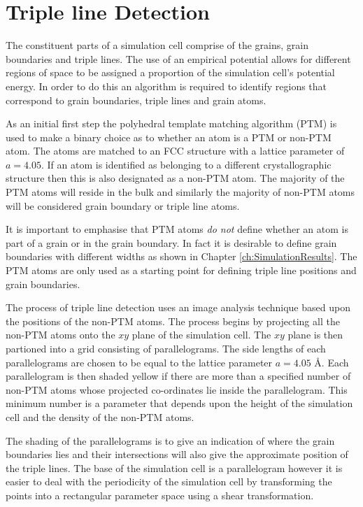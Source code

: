 \documentclass[12pt,a4paper,openany]{report}
\begin{document}
\section{Triple line Detection}

The constituent parts of a simulation cell comprise of the grains, grain boundaries and triple lines. The use of an empirical potential allows for different regions of space to be assigned a proportion of the simulation cell's potential energy. In order to do this an algorithm is required to identify regions that correspond to grain boundaries, triple lines and grain atoms.

As an initial first step the polyhedral template matching algorithm (PTM) is used to make a binary choice as to whether an atom is a PTM or non-PTM atom. The atoms are matched to an FCC structure with a lattice parameter of $a=4.05$. If an atom is identified as belonging to a different crystallographic structure then this is also designated as a non-PTM atom. The majority of the PTM atoms will reside in the bulk and similarly the majority of non-PTM atoms will be considered grain boundary or triple line atoms. 

It is important to emphasise that PTM atoms \emph{do not} define whether an atom is part of a grain or in the grain boundary. In fact it is desirable to define grain boundaries with different widths as shown in Chapter \ref{ch:SimulationResults}. The PTM atoms are only used as a starting point for defining triple line positions and grain boundaries.

The process of triple line detection uses an image analysis technique based upon the positions of the non-PTM atoms. The process begins by projecting all the non-PTM atoms onto the $xy$ plane of the simulation cell. The $xy$ plane is then partioned into a grid consisting of parallelograms. The side lengths of each parallelograms are chosen to be equal to the lattice parameter $a =4.05 \textrm{ \AA}$. Each parallelogram is then shaded yellow if there are more than a specified number of non-PTM atoms whose projected co-ordinates lie inside the parallelogram. This minimum number is a parameter that depends upon the height of the simulation cell and the density of the non-PTM atoms. 

The shading of the parallelograms is to give an indication of where the grain boundaries lies and their intersections will also give the approximate position of the triple lines. The base of the simulation cell is a parallelogram however it is easier to deal with the periodicity of the simulation cell by transforming the points into a rectangular parameter space using a shear transformation. 
\end{document}
